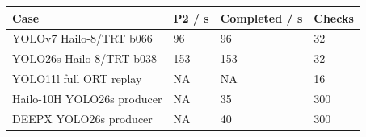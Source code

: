 \begin{tabular}{llll}
\hline
Case & P2 / s & Completed / s & Checks \\
\hline
YOLOv7 Hailo-8/TRT b066 & 96 & 96 & 32 \\
YOLO26s Hailo-8/TRT b038 & 153 & 153 & 32 \\
YOLO11l full ORT replay & NA & NA & 16 \\
Hailo-10H YOLO26s producer & NA & 35 & 300 \\
DEEPX YOLO26s producer & NA & 40 & 300 \\
\hline
\end{tabular}

